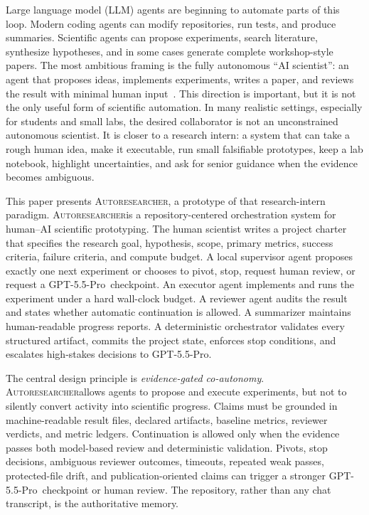 \documentclass{article}
\newcommand{\sys}{\textsc{Autoresearcher}}
\newcommand{\gptpro}{GPT-5.5-Pro}
\begin{document}
Large language model (LLM) agents are beginning to automate parts of this loop. Modern coding agents can modify repositories, run tests, and produce summaries. Scientific agents can propose experiments, search literature, synthesize hypotheses, and in some cases generate complete workshop-style papers. The most ambitious framing is the fully autonomous ``AI scientist'': an agent that proposes ideas, implements experiments, writes a paper, and reviews the result with minimal human input~\citep{lu2024aiscientist,yamada2025aiscientistv2}. This direction is important, but it is not the only useful form of scientific automation. In many realistic settings, especially for students and small labs, the desired collaborator is not an unconstrained autonomous scientist. It is closer to a research intern: a system that can take a rough human idea, make it executable, run small falsifiable prototypes, keep a lab notebook, highlight uncertainties, and ask for senior guidance when the evidence becomes ambiguous.

This paper presents \sys, a prototype of that research-intern paradigm. \sys is a repository-centered orchestration system for human--AI scientific prototyping. The human scientist writes a project charter that specifies the research goal, hypothesis, scope, primary metrics, success criteria, failure criteria, and compute budget. A local supervisor agent proposes exactly one next experiment or chooses to pivot, stop, request human review, or request a \gptpro\ checkpoint. An executor agent implements and runs the experiment under a hard wall-clock budget. A reviewer agent audits the result and states whether automatic continuation is allowed. A summarizer maintains human-readable progress reports. A deterministic orchestrator validates every structured artifact, commits the project state, enforces stop conditions, and escalates high-stakes decisions to \gptpro.

The central design principle is \emph{evidence-gated co-autonomy}. \sys allows agents to propose and execute experiments, but not to silently convert activity into scientific progress. Claims must be grounded in machine-readable result files, declared artifacts, baseline metrics, reviewer verdicts, and metric ledgers. Continuation is allowed only when the evidence passes both model-based review and deterministic validation. Pivots, stop decisions, ambiguous reviewer outcomes, timeouts, repeated weak passes, protected-file drift, and publication-oriented claims can trigger a stronger \gptpro\ checkpoint or human review. The repository, rather than any chat transcript, is the authoritative memory.
\end{document}
